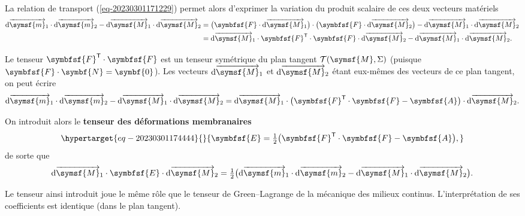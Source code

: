 \documentclass[
  a4paper,
  DIV=11,
  numbers=noendperiod]{scrreprt}
\newcommand{\altvec}[1]{\overrightarrow{#1}}
\newcommand{\D}{{\mathrm d}}
\newcommand{\point}[1]{\symsf{#1}}
\newcommand{\tens}[1]{\symbfsf{#1}}
\newcommand{\transpose}{\mathsf{T}}
\renewcommand{\vec}[1]{\symbf{#1}}
\begin{document}
La relation de transport (\ref{eq-20230301171229}) permet alors
d'exprimer la variation du produit scalaire de ces deux vecteurs
matériels \[
\begin{aligned}[b]
\D\altvec{\point{m}}_1 \cdot \D\altvec{\point{m}}_2 - \D\altvec{\point{M}}_1 \cdot \D\altvec{\point{M}}_2
&= \bigl(\tens{F} \cdot \D\altvec{\point{M}}_1 \bigr) \cdot \bigl(\tens{F} \cdot \D\altvec{\point{M}}_2 \bigr) - \D\altvec{\point{M}}_1 \cdot \D\altvec{\point{M}}_2\\
&= \D\altvec{\point{M}}_1 \cdot \tens{F}^\transpose \cdot \tens{F} \cdot \D\altvec{\point{M}}_2 - \D\altvec{\point{M}}_1 \cdot \D\altvec{\point{M}}_2.
\end{aligned}
\]

Le tenseur \(\tens{F}^\transpose \cdot \tens{F}\) est un tenseur
symétrique du plan tangent \(\mathcal{T}(\point{M}, \Sigma)\) (puisque
\(\tens{F} \cdot \vec{N} = \vec{0}\)). Les vecteurs
\(\D\altvec{\point{M}}_1\) et \(\D\altvec{\point{M}}_2\) étant eux-mêmes
des vecteurs de ce plan tangent, on peut écrire \[
\D\altvec{\point{m}}_1 \cdot \D\altvec{\point{m}}_2 - \D\altvec{\point{M}}_1 \cdot \D\altvec{\point{M}}_2 = \D\altvec{\point{M}}_1 \cdot \bigl( \tens{F}^\transpose \cdot \tens{F} - \tens{A} \bigr) \cdot \D\altvec{\point{M}}_2.
\]

On introduit alors le \textbf{tenseur des déformations membranaires}
\begin{equation}\protect\hypertarget{eq-20230301174444}{}{
\tens{E} = \tfrac{1}{2} \bigl( \tens{F}^\transpose \cdot \tens{F} - \tens{A} \bigr),
}\label{eq-20230301174444}\end{equation} de sorte que \[
\D\altvec{\point{M}}_1 \cdot \tens{E} \cdot \D\altvec{\point{M}}_2 = \tfrac{1}{2} \bigl( \D\altvec{\point{m}}_1 \cdot \D\altvec{\point{m}}_2 - \D\altvec{\point{M}}_1 \cdot \D\altvec{\point{M}}_2 \bigr).
\]

\begin{tcolorbox}[enhanced jigsaw, toprule=.15mm, breakable, left=2mm, rightrule=.15mm, colbacktitle=quarto-callout-note-color!10!white, colframe=quarto-callout-note-color-frame, title=\textcolor{quarto-callout-note-color}{\faInfo}\hspace{0.5em}{Note}, bottomtitle=1mm, arc=.35mm, coltitle=black, opacityback=0, leftrule=.75mm, titlerule=0mm, toptitle=1mm, bottomrule=.15mm, opacitybacktitle=0.6, colback=white]

Le tenseur ainsi introduit joue le même rôle que le tenseur de
Green--Lagrange de la mécanique des milieux continus. L'interprétation
de ses coefficients est identique (dans le plan tangent).

\end{tcolorbox}
\end{document}
